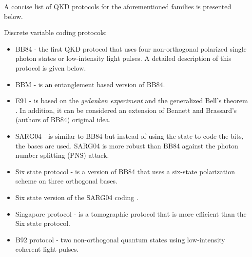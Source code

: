 \documentclass[conference, letterpaper]{IEEEtran}
\begin{document}
A concise list of QKD protocols for the aforementioned families is presented below.

Discrete variable coding protocols:
\begin{itemize}
    \item BB84 \cite{BennettCharlesandBrassard1984,Bennett1992} - the first QKD protocol that uses four non-orthogonal polarized single photon states or low-intensity light pulses. A detailed description of this protocol is given below.
    \item BBM \cite{bennett1992quantum_Bassard} - is an entanglement based version of BB84.
    \item E91 \cite{ekert1991quantum} - is based on the \textit{gedanken experiment} \cite{bohm1951quantum} and the generalized Bell's theorem \cite{clauser1969proposed}. In addition, it can be considered an extension of Bennett and Brassard's (authors of BB84) original idea. 
    \item SARG04  \cite{scarani2004quantum,acin2004coherent} - is similar to BB84 but instead of using the state to code the bits, the bases are used. SARG04 is more robust than BB84 against the photon number splitting (PNS) attack.

\item Six state protocol \cite{bennett1984g,bruss1998optimal,bechmann1999incoherent} - is a version of BB84 that uses a six-state polarization scheme on three orthogonal bases. 
 \item Six state version of the SARG04 coding \cite{tamaki2006unconditionally}.
\item Singapore protocol \cite{englert2004efficient} -  is a tomographic protocol that is more efficient than the Six state protocol. 
\item B92 protocol \cite{bennett1992quantum} - two non-orthogonal quantum states using low-intensity coherent light pulses.\\
    \end{itemize}
    
\end{document}
